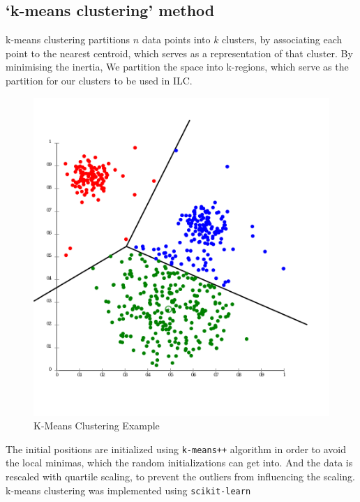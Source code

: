\subsection{`k-means clustering' method}
k-means clustering partitions $n$ data points into $k$ clusters, by associating each point to the
nearest centroid, which serves as a representation of that cluster. By minimising the inertia,
We partition the space into k-regions, which serve as the partition for our clusters to be used in
ILC.
\begin{figure}
  \begin{center}
  \includegraphics[width = 0.5\linewidth]{kmeans_example.png}
  \end{center}
  \caption{K-Means Clustering Example}
\end{figure}

The initial positions are initialized using \texttt{k-means++} algorithm in order to avoid the
local minimas, which the random initializations can get into. And the data is rescaled with
quartile scaling, to prevent the outliers from influencing the scaling.
k-means clustering was implemented
using \texttt{scikit-learn} \cite{scikit-learn}

